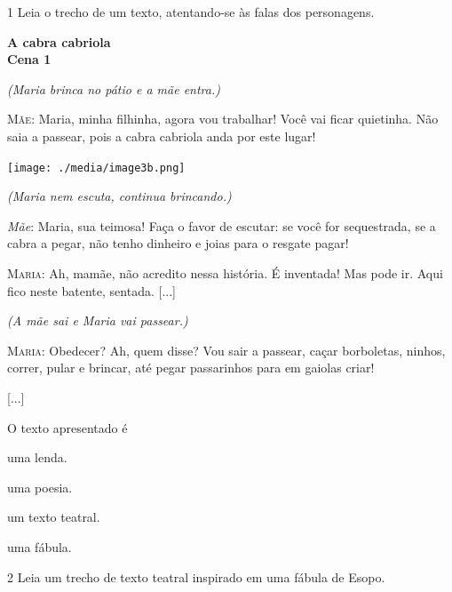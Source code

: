 \num{1} Leia o trecho de um texto, atentando-se às falas dos personagens.

\begin{myquote}
\textbf{A cabra cabriola}\\
\textbf{Cena 1}

\textit{(Maria brinca no pátio e a mãe entra.)}

\textsc{Mãe}: Maria, minha filhinha, agora vou trabalhar! Você vai ficar
quietinha. Não saia a passear, pois a cabra cabriola anda por este
lugar!

\begin{center}
\noindent\texttt{[image: ./media/image3b.png]}
\end{center}


\textit{(Maria nem escuta, continua brincando.)}

\emph{Mãe}: Maria, sua teimosa! Faça o favor de escutar: se você for
sequestrada, se a cabra a pegar, não tenho dinheiro e joias para o
resgate pagar!

\textsc{Maria}: Ah, mamãe, não acredito nessa história. É inventada! Mas
pode ir. Aqui fico neste batente, sentada. {[}...{]}

\textit{(A mãe sai e Maria vai passear.)}

\textsc{Maria}: Obedecer? Ah, quem disse? Vou sair a passear, caçar
borboletas, ninhos, correr, pular e brincar, até pegar passarinhos para
em gaiolas criar!

{[}...{]}

\end{myquote}

O texto apresentado é

\begin{escolha}[itemsep=-5pt]
\item uma lenda.

\item uma poesia.

\item um texto teatral.

\item uma fábula.
\end{escolha}


\num{2} Leia um trecho de texto teatral inspirado em uma fábula de Esopo.

